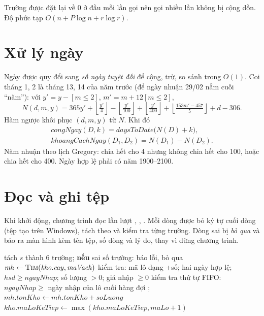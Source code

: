 Trường  được đặt lại về 0 ở đầu mỗi lần gọi nên gọi nhiều lần không bị cộng dồn.
Độ phức tạp $O(n + P\log n + r\log r)$.

\section{Xử lý ngày}

Ngày được quy đổi sang \emph{số ngày tuyệt đối} để cộng, trừ, so sánh trong $O(1)$. Coi tháng 1, 2 là tháng 13,
14 của năm trước (để ngày nhuận 29/02 nằm cuối ``năm''): với $y' = y - [m \le 2]$, $m' = m + 12[m \le 2]$,
\[
  N(d, m, y) = 365y' + \left\lfloor\tfrac{y'}{4}\right\rfloor - \left\lfloor\tfrac{y'}{100}\right\rfloor
  + \left\lfloor\tfrac{y'}{400}\right\rfloor + \left\lfloor\tfrac{153m' - 457}{5}\right\rfloor + d - 306 .
\]
Hàm ngược  khôi phục $(d, m, y)$ từ $N$. Khi đó
\begin{gather*}
  \mathit{congNgay}(D, k) = \mathit{daysToDate}\big(N(D) + k\big), \\
  \mathit{khoangCachNgay}(D_1, D_2) = N(D_1) - N(D_2).
\end{gather*}
Năm nhuận theo lịch Gregory: chia hết cho 4 nhưng không chia hết cho 100, hoặc chia hết cho 400. Ngày hợp lệ phải
có năm 1900--2100.

\section{Đọc và ghi tệp}

Khi khởi động, chương trình đọc lần lượt , , . Mỗi dòng được bỏ
ký tự  cuối dòng (tệp tạo trên Windows), tách theo \code{|} và kiểm tra từng trường.
Dòng sai bị \emph{bỏ qua} và báo ra màn hình kèm tên tệp, số dòng và lý do, thay vì dừng chương trình.

\begin{algorithm}[htbp]
\caption{Đọc tệp lô ()}\label{alg:doclo}
\begin{algorithmic}[1]
  \State tách $s$ thành 6 trường; \textbf{nếu} sai số trường: báo lỗi, bỏ qua
  \State $\mathit{mh} \gets \Call{Tim}{\mathit{kho}.\mathit{cay}, \mathit{maVach}}$ 
  \State kiểm tra: mã lô dạng +số; hai ngày hợp lệ; $\mathit{hsd} \ge \mathit{ngayNhap}$; số lượng $> 0$; giá nhập $\ge 0$
  \State kiểm tra thứ tự FIFO: $\mathit{ngayNhap} \ge$ ngày nhập của lô cuối hàng đợi
  \State {}; $\mathit{mh}.\mathit{tonKho} \gets \mathit{mh}.\mathit{tonKho} + \mathit{soLuong}$ 
  \State $\mathit{kho}.\mathit{maLoKeTiep} \gets \max(\mathit{kho}.\mathit{maLoKeTiep}, \mathit{maLo} + 1)$
\EndFor
\end{algorithmic}
\end{algorithm}

